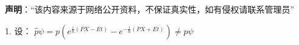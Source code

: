 
\textbf{声明}：“该内容来源于网络公开资料，不保证真实性，如有侵权请联系管理员”



1. 设：
$\hat{p} \psi = p\left(e^{\frac{i}{\hbar}(PX - Et)} - e^{-\frac{i}{\hbar}(PX + Et)}\right) \neq p\psi$


